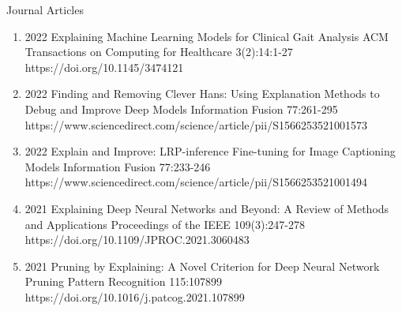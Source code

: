 \documentclass[10pt,a4paper]{article} %
\begin{document}
\headedsection %
{Journal Articles}{ }
{
\begin{enumerate}

    \item {}
                        {2022}
                        {Explaining Machine Learning Models for Clinical Gait Analysis}
                        {ACM Transactions on Computing for Healthcare}
                        {3(2):14:1-27}
                        {https://doi.org/10.1145/3474121}


    \item {}
                        {2022}
                        {Finding and Removing Clever Hans: Using Explanation Methods to Debug and Improve Deep Models}
                        {Information Fusion}
                        {77:261-295}
                        {https://www.sciencedirect.com/science/article/pii/S1566253521001573}


    \item {}
                       {2022}
                       {Explain and Improve: LRP-inference Fine-tuning for Image Captioning Models}
                       {Information Fusion}
                       {77:233-246}
                       {https://www.sciencedirect.com/science/article/pii/S1566253521001494}

    \item {}
                        {2021}
                        {Explaining Deep Neural Networks and Beyond: A Review of Methods and Applications}
                        {Proceedings of the IEEE}
                        {109(3):247-278}
                        {https://doi.org/10.1109/JPROC.2021.3060483}

    \item {}
                        {2021}
                        {Pruning by Explaining: A Novel Criterion for Deep Neural Network Pruning}
                        {Pattern Recognition}
                        {115:107899}
                        {https://doi.org/10.1016/j.patcog.2021.107899}


\end{enumerate}}
\end{document}

